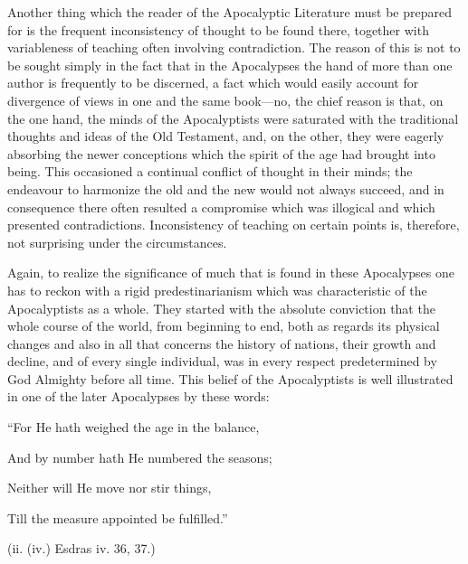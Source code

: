 Another thing which the reader of the Apocalyptic
Literature must be prepared for is the frequent
inconsistency of thought to be found there, together
with variableness of teaching often involving contradiction.
The reason of this is not to be sought
simply in the fact that in the Apocalypses the hand
of more than one author is frequently to be discerned,
a fact which would easily account for divergence
of views in one and the same book—no, the chief
reason is that, on the one hand, the minds of the
Apocalyptists were saturated with the traditional
thoughts and ideas of the Old Testament, and, on
the other, they were eagerly absorbing the newer
conceptions which the spirit of the age had brought
into being. This occasioned a continual conflict
of thought in their minds; the endeavour to
harmonize the old and the new would not always
succeed, and in consequence there often resulted a
compromise which was illogical and which presented
contradictions. Inconsistency of teaching on certain
points is, therefore, not surprising under the
circumstances.

Again, to realize the significance of much that is
found in these Apocalypses one has to reckon with a
rigid predestinarianism which was characteristic of
the Apocalyptists as a whole. They started with
the absolute conviction that the whole course of the
world, from beginning to end, both as regards its
physical changes and also in all that concerns the
history of nations, their growth and decline, and of
every single individual, was in every respect predetermined
by God Almighty before all time. This
belief of the Apocalyptists is well illustrated in one
of the later Apocalypses by these words:

“For He hath weighed the age in the balance,

And by number hath He numbered the seasons;

Neither will He move nor stir things,

Till the measure appointed be fulfilled.”

(ii. (iv.) Esdras iv. 36, 37.)

